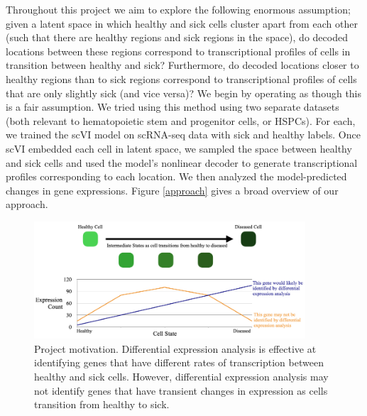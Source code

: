 \documentclass{article}
\begin{document}
Throughout this project we aim to explore the following enormous assumption; given a latent space in which healthy and sick cells cluster apart from each other (such that there are healthy regions and sick regions in the space), do decoded locations between these regions correspond to transcriptional profiles of cells in transition between healthy and sick?
Furthermore, do decoded locations closer to healthy regions than to sick regions correspond to transcriptional profiles of cells that are only slightly sick (and vice versa)?
We begin by operating as though this is a fair assumption.
We tried using this method using two separate datasets (both relevant to hematopoietic stem and progenitor cells, or HSPCs).
For each, we trained the scVI model on scRNA-seq data with sick and healthy labels.
Once scVI embedded each cell in latent space, we sampled the space between healthy and sick cells and used the model's nonlinear decoder to generate transcriptional profiles corresponding to each location.
We then analyzed the model-predicted changes in gene expressions.
Figure \ref*{approach} gives a broad overview of our approach.

\begin{figure}
  \centering
  \includegraphics[width=0.9\textwidth]{cropped_motivation.jpg}
  \caption{Project motivation.
  Differential expression analysis is effective at identifying genes that have different rates of transcription between healthy and sick cells.
  However, differential expression analysis may not identify genes that have transient changes in expression as cells transition from healthy to sick.}
  \label{motivation}
\end{figure}
\end{document}
